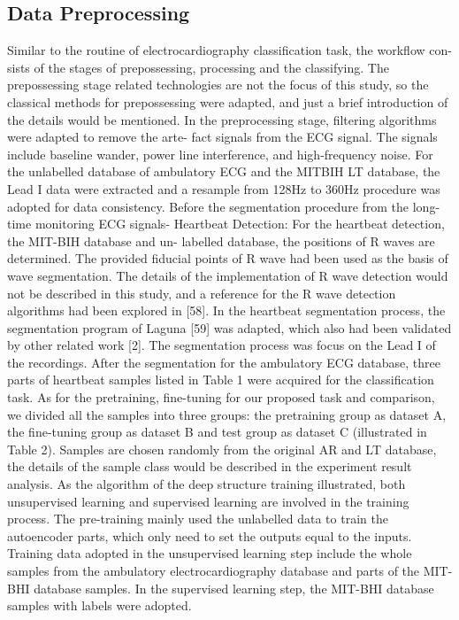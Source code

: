 \documentclass[journal]{IEEEtran}
\begin{document}
\subsection{Data Preprocessing}
Similar to the routine of electrocardiography classification task, the workflow con- sists of the stages of prepossessing, processing and the classifying. The prepossessing stage related technologies are not the focus of this study, so the classical methods for prepossessing were adapted, and just a brief introduction of the details would be mentioned.
In the preprocessing stage, filtering algorithms were adapted to remove the arte- fact signals from the ECG signal. The signals include baseline wander, power line interference, and high-frequency noise. For the unlabelled database of ambulatory ECG and the MITBIH LT database, the Lead I data were extracted and a resample from 128Hz to 360Hz procedure was adopted for data consistency.
Before the segmentation procedure from the long-time monitoring ECG signals- Heartbeat Detection: For the heartbeat detection, the MIT-BIH database and un- labelled database, the positions of R waves are determined. The provided fiducial points of R wave had been used as the basis of wave segmentation. The details of the implementation of R wave detection would not be described in this study, and a reference for the R wave detection algorithms had been explored in [58].
In the heartbeat segmentation process, the segmentation program of Laguna [59] was adapted, which also had been validated by other related work [2]. The segmentation process was focus on the Lead I of the recordings. After the segmentation for the ambulatory ECG database, three parts of heartbeat samples listed in Table 1 were acquired for the classification task. As for the pretraining, fine-tuning for our proposed task and comparison, we divided all the samples into three groups: the pretraining group as dataset A, the fine-tuning group as dataset B and test group as dataset C (illustrated in Table 2). Samples are chosen randomly from the original AR and LT database, the details of the sample class would be described in the experiment result analysis. As the algorithm of the deep structure training illustrated, both unsupervised learning and supervised learning are involved in the training process. The pre-training mainly used the unlabelled data to train the autoencoder parts, which only need to set the outputs equal to the inputs. Training data adopted in the unsupervised learning step include the whole samples from the ambulatory electrocardiography database and parts of the MIT-BHI database samples. In the supervised learning step, the MIT-BHI database samples with labels were adopted.
\end{document}
